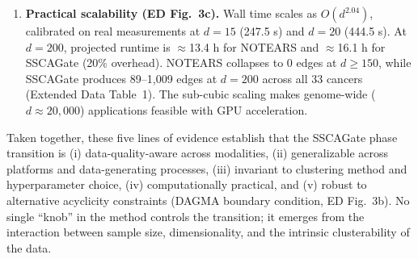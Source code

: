 \documentclass[12pt,a4paper]{article}
\begin{document}
\begin{enumerate}
\item \textbf{Practical scalability (ED Fig.\ 3c).}
Wall time scales as $O(d^{2.04})$, calibrated on real measurements at $d = 15$ (247.5 s) and $d = 20$ (444.5 s).
At $d = 200$, projected runtime is $\approx$13.4 h for NOTEARS and $\approx$16.1 h for SSCAGate (20\% overhead).
NOTEARS collapses to 0 edges at $d \geq 150$, while SSCAGate produces 89--1,009 edges at $d = 200$ across all 33 cancers (Extended Data Table~1).
The sub-cubic scaling makes genome-wide ($d \approx 20{,}000$) applications feasible with GPU acceleration.

\end{enumerate}

\noindent Taken together, these five lines of evidence establish that the SSCAGate phase transition is (i) data-quality-aware across modalities, (ii) generalizable across platforms and data-generating processes, (iii) invariant to clustering method and hyperparameter choice, (iv) computationally practical, and (v) robust to alternative acyclicity constraints (DAGMA boundary condition, ED Fig.\ 3b). No single ``knob'' in the method controls the transition; it emerges from the interaction between sample size, dimensionality, and the intrinsic clusterability of the data.
\end{document}
